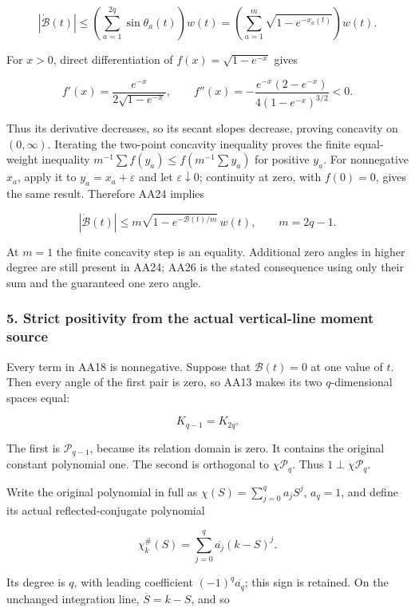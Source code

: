 \documentclass{article}
\begin{document}
\[
|\dot{\mathcal B}(t)|
\le\left(\sum_{a=1}^{2q}\sin\theta_a(t)\right)w(t)
=\left(\sum_{a=1}^{m}\sqrt{1-e^{-x_a(t)}}\right)w(t).
\tag{AA24}
\]

For \(x>0\), direct differentiation of \(f(x)=\sqrt{1-e^{-x}}\) gives

\[
f'(x)=\frac{e^{-x}}{2\sqrt{1-e^{-x}}},\qquad
f''(x)=-\frac{e^{-x}(2-e^{-x})}{4(1-e^{-x})^{3/2}}<0.
\tag{AA25}
\]

Thus its derivative decreases, so its secant slopes decrease, proving concavity on \((0,\infty)\). Iterating the two-point concavity inequality proves the finite equal-weight inequality \(m^{-1}\sum f(y_a)\le f(m^{-1}\sum y_a)\) for positive \(y_a\). For nonnegative \(x_a\), apply it to \(y_a=x_a+\varepsilon\) and let \(\varepsilon\downarrow0\); continuity at zero, with \(f(0)=0\), gives the same result. Therefore AA24 implies

\[
\boxed{
|\dot{\mathcal B}(t)|
\le m\sqrt{1-e^{-\mathcal B(t)/m}}\,w(t),
\qquad m=2q-1.
}
\tag{AA26}
\]

At \(m=1\) the finite concavity step is an equality. Additional zero angles in higher degree are still present in AA24; AA26 is the stated consequence using only their sum and the guaranteed one zero angle.

\subsubsection{5. Strict positivity from the actual vertical-line moment source}\label{endpoint-all_degree_angle_review--strict-positivity-from-the-actual-vertical-line-moment-source}

Every term in AA18 is nonnegative. Suppose that \(\mathcal B(t)=0\) at one value of \(t\). Then every angle of the first pair is zero, so AA13 makes its two \(q\)-dimensional spaces equal:

\[
K_{q-1}=K_{2q}.
\tag{AA27}
\]

The first is \(\mathcal P_{q-1}\), because its relation domain is zero. It contains the original constant polynomial one. The second is orthogonal to \(\chi\mathcal P_q\). Thus \(1\perp\chi\mathcal P_q\).

Write the original polynomial in full as \(\chi(S)=\sum_{j=0}^q a_jS^j\), \(a_q=1\), and define its actual reflected-conjugate polynomial

\[
\chi_k^{\#}(S)=\sum_{j=0}^q\overline{a_j}(k-S)^j.
\tag{AA28}
\]

Its degree is \(q\), with leading coefficient \((-1)^q\overline{a_q}\); this sign is retained. On the unchanged integration line, \(\overline S=k-S\), and so
\end{document}
